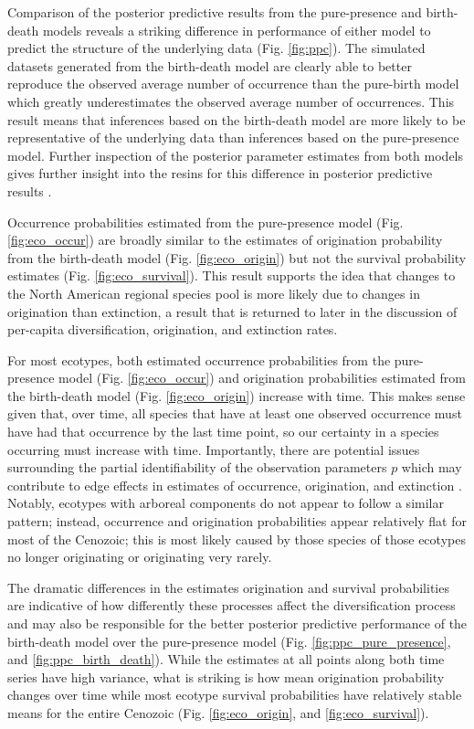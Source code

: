 \documentclass[12pt,letterpaper]{article}
\begin{document}
Comparison of the posterior predictive results from the pure-presence and birth-death models reveals a striking difference in performance of either model to predict the structure of the underlying data (Fig. \ref{fig:ppc}). The simulated datasets generated from the birth-death model are clearly able to better reproduce the observed average number of occurrence than the pure-birth model which greatly underestimates the observed average number of occurrences. This result means that inferences based on the birth-death model are more likely to be representative of the underlying data than inferences based on the pure-presence model. Further inspection of the posterior parameter estimates from both models gives further insight into the resins for this difference in posterior predictive results \citep{Gelman2013d}. 


Occurrence probabilities estimated from the pure-presence model (Fig. \ref{fig:eco_occur}) are broadly similar to the estimates of origination probability from the birth-death model (Fig. \ref{fig:eco_origin}) but not the survival probability estimates (Fig. \ref{fig:eco_survival}). This result supports the idea that changes to the North American regional species pool is more likely due to changes in origination than extinction, a result that is returned to later in the discussion of per-capita diversification, origination, and extinction rates.

For most ecotypes, both estimated occurrence probabilities from the pure-presence model (Fig. \ref{fig:eco_occur}) and origination probabilities estimated from the birth-death model (Fig. \ref{fig:eco_origin}) increase with time. This makes sense given that, over time, all species that have at least one observed occurrence must have had that occurrence by the last time point, so our certainty in a species occurring must increase with time. Importantly, there are potential issues surrounding the partial identifiability of the observation parameters \(p\) which may contribute to edge effects in estimates of occurrence, origination, and extinction \citep{Royle2008}. Notably, ecotypes with arboreal components do not appear to follow a similar pattern; instead, occurrence and origination probabilities appear relatively flat for most of the Cenozoic; this is most likely caused by those species of those ecotypes no longer originating or originating very rarely.

The dramatic differences in the estimates origination and survival probabilities are indicative of how differently these processes affect the diversification process and may also be responsible for the better posterior predictive performance of the birth-death model over the pure-presence model (Fig. \ref{fig:ppc_pure_presence}, and \ref{fig:ppc_birth_death}). While the estimates at all points along both time series have high variance, what is striking is how mean origination probability changes over time while most ecotype survival probabilities have relatively stable means for the entire Cenozoic (Fig. \ref{fig:eco_origin}, and \ref{fig:eco_survival}).
\end{document}
